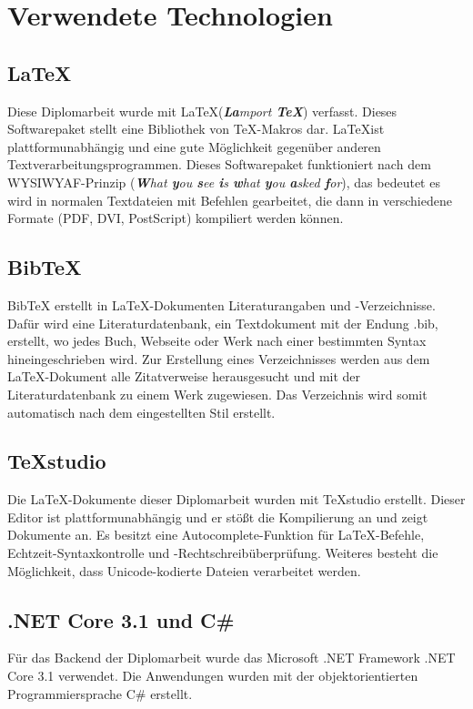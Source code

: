 \chapter{Verwendete Technologien} \label{technologien}

\section{\LaTeX}
Diese Diplomarbeit wurde mit \LaTeX \space (\textit{{\bf{\textit{La}}}mport {\bf{\textit{\TeX}}}}) verfasst. Dieses Softwarepaket stellt eine Bibliothek von \TeX-Makros dar. \LaTeX \space ist plattformunabhängig und eine gute Möglichkeit gegenüber anderen Textverarbeitungsprogrammen. Dieses Softwarepaket funktioniert nach dem WYSIWYAF-Prinzip (\textit{{\bf{W}}hat {\bf{y}}ou {\bf{s}}ee {\bf{i}}s {\bf{w}}hat {\bf{y}}ou {\bf{a}}sked {\bf{f}}or}), das bedeutet es wird in normalen Textdateien mit Befehlen gearbeitet, die dann in verschiedene Formate (PDF, DVI, PostScript) kompiliert werden können. \autocite{wikiLatex}

\section{BibTeX}
BibTeX erstellt in \LaTeX-Dokumenten Literaturangaben und -Verzeichnisse. Dafür wird eine Literaturdatenbank, ein Textdokument mit der Endung .bib, erstellt, wo jedes Buch, Webseite oder Werk nach einer bestimmten Syntax hineingeschrieben wird. Zur Erstellung eines Verzeichnisses werden aus dem \LaTeX-Dokument alle Zitatverweise herausgesucht und mit der Literaturdatenbank zu einem Werk zugewiesen. Das Verzeichnis wird somit automatisch nach dem eingestellten Stil erstellt. \autocite{wikiBibtex}

\section{TeXstudio}
Die \LaTeX-Dokumente dieser Diplomarbeit wurden mit TeXstudio erstellt. Dieser Editor ist plattformunabhängig und er stößt die Kompilierung an und zeigt Dokumente an. Es besitzt eine Autocomplete-Funktion für \LaTeX-Befehle, Echtzeit-Syntaxkontrolle und -Rechtschreibüberprüfung. Weiteres besteht die Möglichkeit, dass Unicode-kodierte Dateien verarbeitet werden. \autocite{wikiTexstudio}

\section{.NET Core 3.1 und C\#}
Für das Backend der Diplomarbeit wurde das Microsoft .NET Framework .NET Core 3.1 verwendet. Die Anwendungen wurden mit der objektorientierten Programmiersprache C\#  erstellt. \autocite{wikiDotnet}

